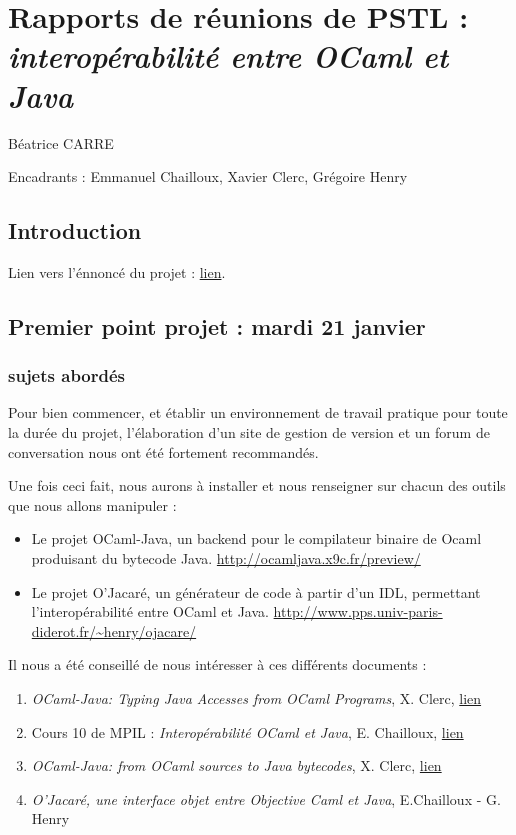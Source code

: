 \documentclass[a4paper, 11pt]{report}
\begin{document}
\chapter{Rapports de réunions de PSTL : \emph{interopérabilité entre OCaml et Java}}

Béatrice CARRE

Encadrants : Emmanuel Chailloux, Xavier Clerc, Grégoire Henry

\section*{Introduction}
Lien vers l'énnoncé du projet : 
\href{https://www-master.ufr-info-p6.jussieu.fr/2013/interoperabilite-entre-OCaml-et}{lien}.

\section{Premier point projet : mardi 21 janvier}
\subsection{sujets abordés}

Pour bien commencer, et établir un environnement de travail pratique
pour toute la durée du projet, l'élaboration d'un site de gestion de
version et un forum de conversation nous ont été fortement
recommandés.

Une fois ceci fait, nous aurons à installer et nous renseigner sur chacun des
outils que nous allons manipuler :
\begin{itemize}
\item Le projet OCaml-Java, un backend pour le compilateur binaire de Ocaml produisant du bytecode Java. \url{http://ocamljava.x9c.fr/preview/}
\item Le projet O'Jacaré, un générateur de code à partir d'un IDL, permettant l'interopérabilité entre OCaml et Java. \url{http://www.pps.univ-paris-diderot.fr/~henry/ojacare/}
\end{itemize}
Il nous a été conseillé de nous intéresser à ces différents documents :
\begin{enumerate}
\item \emph{OCaml-Java: Typing Java Accesses from OCaml Programs}, X. Clerc,
\href{http://www.cs.ru.nl/P.Achten/IFL2013/symposium_proceedings_IFL2013/ifl2013_submission_17.pdf}{lien}
\item Cours 10 de MPIL : \emph{Interopérabilité OCaml et Java}, E. Chailloux,
\href{https://www-licence.ufr-info-p6.jussieu.fr/lmd/licence/2013/ue/LI332-2013oct/public/cours/COURS10.pdf}{lien}
\item \emph{OCaml-Java: from OCaml sources to Java bytecodes}, X. Clerc,
\href{http://www.lexifi.com/ml2012/full9.pd}{lien}
\item \emph{O'Jacaré, une interface objet entre Objective Caml et Java}, E.Chailloux - G. Henry
\end{enumerate}
\end{document}
